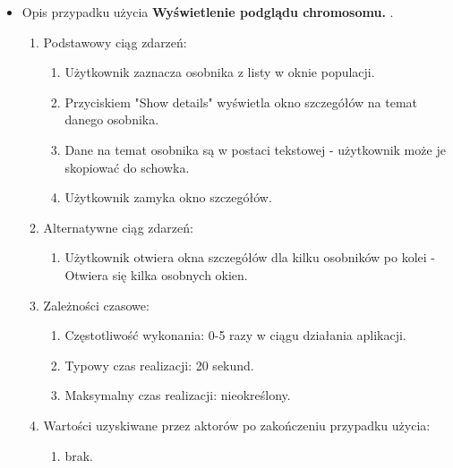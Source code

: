 \begin{par}
\begin{itemize}
\begin{enumerate}
\begin{enumerate}
		\end{enumerate}
	\end{enumerate}
	\item
	Opis przypadku użycia {\bf Wyświetlenie podglądu chromosomu. }.
	\begin{enumerate}
	\item Podstawowy ciąg zdarzeń:
		\begin{enumerate}
		\item Użytkownik zaznacza osobnika z listy w oknie populacji.
		\item Przyciskiem "Show details" wyświetla okno szczegółów na temat danego osobnika.
		\item Dane na temat osobnika są w postaci tekstowej - użytkownik może je skopiować do schowka.
		\item Użytkownik zamyka okno szczegółów.
		\end{enumerate}
	\item Alternatywne ciąg zdarzeń:
		\begin{enumerate}
		\item Użytkownik otwiera okna szczegółów dla kilku osobników po kolei - Otwiera się kilka osobnych okien.
		\end{enumerate}
	\item Zależności czasowe:
		\begin{enumerate}
		\item Częstotliwość wykonania: 0-5 razy w ciągu działania aplikacji.
		\item Typowy czas realizacji: 20 sekund.
		\item Maksymalny czas realizacji: nieokreślony.
		\end{enumerate}
	\item Wartości uzyskiwane przez aktorów po zakończeniu przypadku użycia:
		\begin{enumerate}
		\item brak.
		\end{enumerate}
	\end{enumerate}


\end{itemize}
\end{par}
